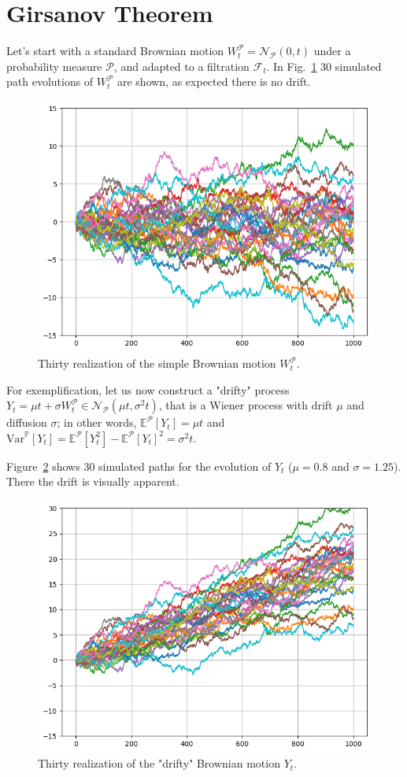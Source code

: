 \documentclass[12pt,a4paper]{article}
\begin{document}
\clearpage
\section{Girsanov Theorem}
Let’s start with a standard Brownian motion $W_t^{\mathcal{P}} = \mathcal{N}_{\mathcal{P}}(0,t)$ under a probability measure $\mathcal{P}$, and adapted to a filtration $\mathcal{F}_t$. In Fig.~\ref{fig:brownian_motion_nodrift} 30 simulated path evolutions of $W_t^{\mathcal{P}}$ are shown, as expected there is no drift.
	
\begin{figure}[htbp]
	\begin{center}
		\includegraphics[width=0.5\linewidth]{addons/brownian_motion_nodrift}
	\end{center}
	\label{fig:brownian_motion_nodrift}
	\caption{Thirty realization of the simple Brownian motion $W_t^{\mathcal{P}}$.}
\end{figure}

For exemplification, let us now construct a "drifty" process $Y_t=\mu t+\sigma W_t^{\mathcal{P}}\in \mathcal{N}_{\mathcal{P}}(\mu t, \sigma^2 t)$, that is a Wiener process with drift $\mu$ and diffusion $\sigma$; in other words, $\mathbb{E}^{\mathcal{P}}[Y_t]=\mu t$ and $\text{Var}^{\mathbb{P}}[Y_t]=\mathbb{E}^{\mathcal{P}}[Y^2_t]-\mathbb{E}^{\mathcal{P}}[Y_t]^2=\sigma^2 t$.

Figure~\ref{fig:brownian_motion_drift} shows 30 simulated paths for the evolution of $Y_t$ ($\mu = 0.8$ and $\sigma =1.25$). There the drift is visually apparent.
\begin{figure}[htbp]
\begin{center}
	\includegraphics[width=0.5\linewidth]{addons/brownian_motion_drift}
\end{center}
\label{fig:brownian_motion_drift}
	\caption{Thirty realization of the "drifty" Brownian motion $Y_t$.}
\end{figure}
\end{document}
